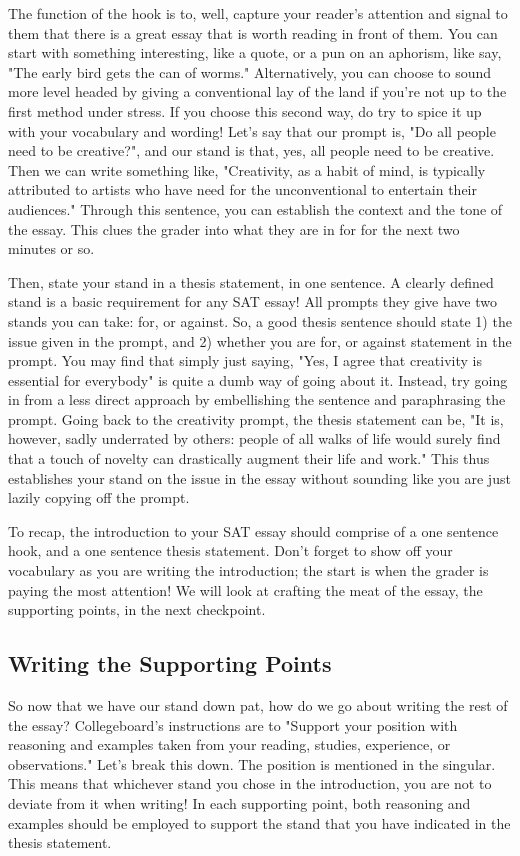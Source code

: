 \documentclass[DIV=calc,11pt,parskip,numbers=noenddot]{scrartcl} %
\begin{document}
The function of the hook is to, well, capture your reader’s attention and signal to them that there is a great essay that is worth reading in front of them. You can start with something interesting, like a quote, or a pun on an aphorism, like say, "The early bird gets the can of worms." Alternatively, you can choose to sound more level headed by giving a conventional lay of the land if you’re not up to the first method under stress. If you choose this second way, do try to spice it up with your vocabulary and wording! Let’s say that our prompt is, "Do all people need to be creative?", and our stand is that, yes, all people need to be creative. Then we can write something like, "Creativity, as a habit of mind, is typically attributed to artists who have need for the unconventional to entertain their audiences." Through this sentence, you can establish the context and the tone of the essay. This clues the grader into what they are in for for the next two minutes or so.

Then, state your stand in a thesis statement, in one sentence. A clearly defined stand is a basic requirement for any SAT essay! All prompts they give have two stands you can take: for, or against. So, a good thesis sentence should state 1) the issue given in the prompt, and 2) whether you are for, or against statement in the prompt. You may find that simply just saying, "Yes, I agree that creativity is essential for everybody" is quite a dumb way of going about it. Instead, try going in from a less direct approach by embellishing the sentence and paraphrasing the prompt. Going back to the creativity prompt, the thesis statement can be, "It is, however, sadly underrated by others: people of all walks of life would surely find that a touch of novelty can drastically augment their life and work." This thus establishes your stand on the issue in the essay without sounding like you are just lazily copying off the prompt.

To recap, the introduction to your SAT essay should comprise of a one sentence hook, and a one sentence thesis statement. Don’t forget to show off your vocabulary as you are writing the introduction; the start is when the grader is paying the most attention! We will look at crafting the meat of the essay, the supporting points, in the next checkpoint.
\subsection{Writing the Supporting Points}
So now that we have our stand down pat, how do we go about writing the rest of the essay? Collegeboard’s instructions are to "Support your position with reasoning and examples taken from your reading, studies, experience, or observations." Let’s break this down. The position is mentioned in the singular. This means that whichever stand you chose in the introduction, you are not to deviate from it when writing! In each supporting point, both reasoning and examples should be employed to support the stand that you have indicated in the thesis statement. 
\end{document}

